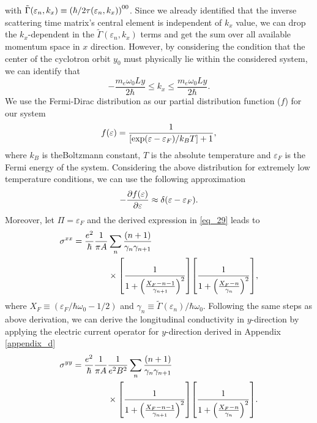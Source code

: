 with $\tilde{{\Gamma}}(\varepsilon_n,k_x) \equiv \qty({\hbar}/{2\tau(\varepsilon_n,k_x)})^{00}$. Since we already identified that the inverse scattering time matrix's central element is independent of $k_x$ value, we can drop the $k_x$-dependent in the $\tilde{{\Gamma}}(\varepsilon_n,k_x)$ terms and get the sum over all available momentum space in $x$ direction.
However, by considering the condition that the center of the cyclotron orbit $y_0$ must physically lie within the considered system, we can identify that
\begin{equation} \label{eq_30}
 -\frac{m_e\omega_0 Ly}{2\hbar} \leq k_x \leq \frac{m_e\omega_0 Ly}{2\hbar}.
\end{equation}
We use the Fermi-Dirac distribution as our partial distribution function ($f$) for our system
\begin{equation} \label{eq_31}
  f(\varepsilon) = \frac{1}{\qty[\exp(\varepsilon - \varepsilon_F)/k_B T]+1},
\end{equation}
where $k_B$ is theBoltzmann constant, $T$ is the absolute temperature and $\varepsilon_F$ is the Fermi energy of the system. Considering the above distribution for extremely low temperature conditions, we can use the following approximation
\begin{equation} \label{eq_32}
  - \pdv{f(\varepsilon)}{\varepsilon} \approx \delta(\varepsilon - \varepsilon_F).
\end{equation}
Moreover, let $\Pi = \varepsilon_F$ and the derived expression in \ref{eq_29} leads to
\begin{equation} \label{eq_33}
  \begin{aligned}
    {\sigma}^{xx}  =
    \frac{e^2}{\hbar}
    \frac{1}{\pi A} &
    \sum_{n}
    \frac{\qty(n+1)}{\gamma_{n}\gamma_{n+1}} \\
    &\times
    \qty[
      \frac{1}
      {
        1 + \qty(\frac{X_F - n -1}{\gamma_{n+1}})^2
      }
    ]
    \qty[
      \frac{1}
      {
        1 + \qty(\frac{X_F - n}{\gamma_{n}})^2
      }
    ],
  \end{aligned}
\end{equation}
where $X_F \equiv ({\varepsilon_F}/{\hbar \omega_0} - {1}/{2})$
and
$\gamma_n \equiv {\tilde{{\Gamma}}(\varepsilon_n)}/{\hbar \omega_0}$.
Following the same steps as above derivation, we can derive the longitudinal conductivity in $y$-direction by applying the electric current operator for $y$-direction derived in Appendix \ref{appendix_d}
\begin{equation} \label{eq_34}
  \begin{aligned}
    {\sigma}^{yy} =
    \frac{e^2}{\hbar}
    \frac{1}{\pi A}&
    \frac{1}{e^2B^2}
    \sum_{n}
    \frac{\qty(n+1)}{\gamma_{n}\gamma_{n+1}} \\
    & \times
    \qty[
      \frac{1}
      {
        1 + \qty(\frac{X_F - n -1}{\gamma_{n+1}})^2
      }
    ]
    \qty[
      \frac{1}
      {
        1 + \qty(\frac{X_F - n}{\gamma_{n}})^2
      }
    ].
  \end{aligned}
\end{equation}
